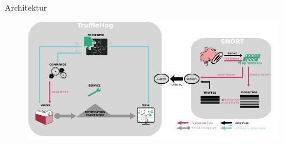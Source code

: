 \begin{frame}{Architektur}
    \begin{figure}
    	\centering
    	\includegraphics[width=\textwidth]{./images/14.pdf}
    \end{figure}
\end{frame}
